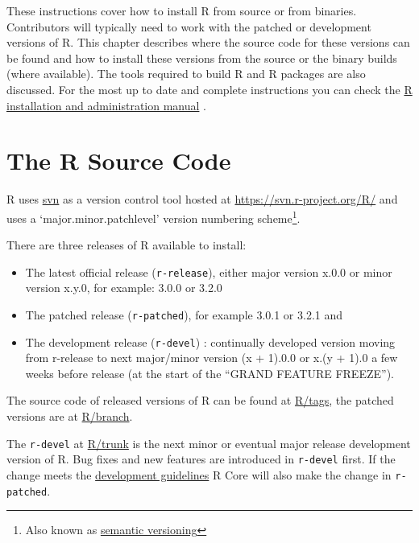 \documentclass[
]{book}
\begin{document}
These instructions cover how to install R from source or from binaries.
Contributors will typically need to work with the patched or development versions of R.
This chapter describes where the source code for these versions can be found and how to install these versions from the source or the binary builds (where available).
The tools required to build R and R packages are also discussed.
For the most up to date and complete instructions you can check the \href{https://cran.r-project.org/doc/manuals/r-devel/R-admin.html}{R installation and administration manual} .

\hypertarget{the-r-source-code}{%
\section{The R Source Code}\label{the-r-source-code}}

R uses \href{https://subversion.apache.org/}{svn} as a version control tool hosted at \url{https://svn.r-project.org/R/} and uses a `major.minor.patchlevel' version numbering scheme\footnote{Also known as \href{https://en.wikipedia.org/wiki/Software_versioning\#Semantic_versioning}{semantic versioning}}.

There are three releases of R available to install:

\begin{itemize}
\item
  The latest official release (\texttt{r-release}), either major version x.0.0 or minor version x.y.0, for example: 3.0.0 or 3.2.0
\item
  The patched release (\texttt{r-patched}), for example 3.0.1 or 3.2.1 and
\item
  The development release (\texttt{r-devel}) : continually developed version moving from r-release to next major/minor version (x + 1).0.0 or x.(y + 1).0 a few weeks before release (at the start of the ``GRAND FEATURE FREEZE'').
\end{itemize}

The source code of released versions of R can be found at \href{https://svn.r-project.org/R/tags/}{R/tags}, the patched versions are at \href{https://svn.r-project.org/R/branches/}{R/branch}.

The \texttt{r-devel} at \href{https://svn.r-project.org/R/trunk}{R/trunk} is the next minor or eventual major release development version of R.
Bug fixes and new features are introduced in \texttt{r-devel} first.
If the change meets the \href{https://developer.r-project.org/devel-guidelines.txt}{development guidelines} R Core will also make the change in \texttt{r-patched}.
\end{document}
